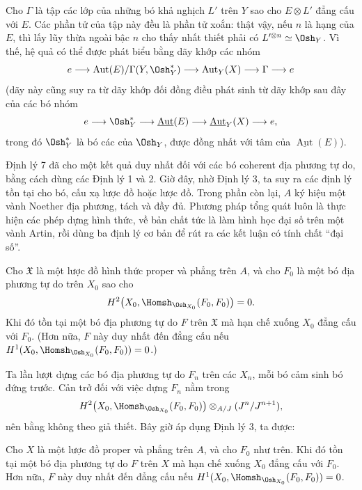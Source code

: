 Cho $\Gamma$ là tập các lớp của những bó khả nghịch $L'$ trên $Y$ sao cho
$E\otimes L'$ đẳng cấu với $E$. Các phần tử của tập này đều là phần tử xoắn:
thật vậy, nếu $n$ là hạng của $E$, thì lấy lũy thừa ngoài bậc $n$ cho thấy
nhất thiết phải có
$L'^{\otimes n}\simeq\Osh_Y$. Vì thế, hệ quả có thể được phát biểu bằng dãy
khớp các nhóm
\[
  e\longrightarrow
  \operatorname{Aut}(E)/\Gamma(Y,\Osh_Y^*)
  \longrightarrow \operatorname{Aut}_Y(X)
  \longrightarrow \Gamma\longrightarrow e
\]
(dãy này cũng suy ra từ dãy khớp đối đồng điều phát sinh từ dãy khớp sau đây
của các bó nhóm
\[
  e\longrightarrow \Osh_Y^*
  \longrightarrow \underline{\operatorname{Aut}}(E)
  \longrightarrow \underline{\operatorname{Aut}}_Y(X)
  \longrightarrow e,
\]
trong đó $\Osh_Y^*$ là bó các  của $\Osh_Y$, được đồng nhất với
tâm của $\underline{\operatorname{Aut}}(E)$).


Định lý 7 đã cho một kết quả duy nhất đối với các bó coherent địa phương tự do,
bằng cách dùng các Định lý 1 và 2. Giờ đây, nhờ Định lý 3, ta suy ra các định
lý tồn tại cho bó, cấu xạ lược đồ hoặc lược đồ. Trong phần còn lại, $A$ ký hiệu
một vành Noether địa phương, tách và đầy đủ. Phương pháp tổng quát luôn là thực
hiện các phép dựng hình thức, về bản chất tức là làm hình học đại số trên một
vành Artin, rồi dùng ba định lý cơ bản để rút ra các kết luận có tính chất
“đại số”.

 Cho $\mathfrak X$ là một lược đồ hình thức proper và phẳng
trên $A$, và cho $F_0$ là một bó địa phương tự do trên $X_0$ sao cho
\[
  H^2\bigl(X_0,\Homsh_{\Osh_{X_0}}(F_0,F_0)\bigr)=0.
\]
Khi đó tồn tại một bó địa phương tự do $F$ trên $\mathfrak X$ mà hạn chế xuống
$X_0$ đẳng cấu với $F_0$. (Hơn nữa, $F$ này duy nhất đến đẳng cấu nếu
$H^1(X_0,\Homsh_{\Osh_{X_0}}(F_0,F_0))=0$.)

Ta lần lượt dựng các bó địa phương tự do $F_n$ trên các $X_n$, mỗi bó cảm sinh
bó đứng trước. Cản trở đối với việc dựng $F_n$ nằm trong
\[
  H^2\bigl(X_0,\Homsh_{\Osh_{X_0}}(F_0,F_0)\bigr)
  \otimes_{A/J}(J^n/J^{n+1}),
\]
nên bằng không theo giả thiết. Bây giờ áp dụng Định lý 3, ta được:

 Cho $X$ là một lược đồ proper và phẳng trên $A$, và cho
$F_0$ như trên. Khi đó tồn tại một bó địa phương tự do $F$ trên $X$ mà hạn chế
xuống $X_0$ đẳng cấu với $F_0$. Hơn nữa, $F$ này duy nhất đến đẳng cấu nếu
$H^1(X_0,\Homsh_{\Osh_{X_0}}(F_0,F_0))=0$.

